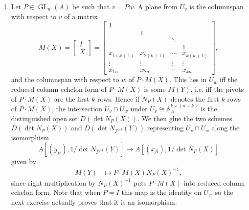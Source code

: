 \documentclass{report}
\newcommand{\A}{\mathbb{A}}
\DeclareMathOperator{\GL}{GL}
\begin{document}
\begin{enumerate}[label=\textbf{6.7.\Alph*.}]
	\item Let $P\in\GL_n(A)$ be such that $v=Pw$. A plane from $U_v$ is the
	      columnspan with respect to $v$ of a matrix
	      \begin{equation*}
		      M(X) = \left[\begin{array}{c}
				      I \\
				      X
			      \end{array}\right] =
		      \begin{bmatrix}
			      1          &            &        &            \\
			                 & 1          &        &            \\
			                 &            & \ddots &            \\
			                 &            &        & 1          \\
			      x_{1(k+1)} & x_{2(k+1)} & \cdots & x_{k(k+1)} \\
			      \vdots     & \vdots     & \vdots & \vdots     \\
			      x_{1n}     & x_{2n}     & \cdots & x_{kn}
		      \end{bmatrix},
	      \end{equation*}
	      and the columnspan with respect to $w$ of $P\cdot M(X)$. This lies in
	      $U_w$ iff the reduced column echelon form of $P\cdot M(X)$ is some
	      $M(Y)$, i.e. iff the pivots of $P\cdot M(X)$ are the first $k$ rows.
	      Hence if $N_P(X)$ denotes the first $k$ rows of $P\cdot M(X)$, the
	      intersection $U_v\cap U_w$ under $U_v\cong\A^{k\times(n-k)}_A$ is the
	      distinguished open set $D(\det N_P(X))$. We then glue the two schemes
	      $D(\det N_P(X))$ and $D(\det N_{P^{-1}}(Y))$ representing $U_v\cap U_w$
	      along the isomorphism
	      \begin{equation*}
		      A[(y_{ji}),1/\det N_{P^{-1}}(Y)] \to A[(x_{ji}),1/\det N_P(X)]
	      \end{equation*}
	      given by
	      \begin{align*}
		      M(Y) & \mapsto P\cdot M(X)N_P(X)^{-1},
	      \end{align*}
	      since right multiplication by $N_P(X)^{-1}$ puts $P\cdot M(X)$ into
	      reduced column echelon form. Note that when $P=I$ this map is the
	      identity on $U_v$, so the next exercise actually proves that it is an
	      isomorphism.


\end{enumerate}
\end{document}
